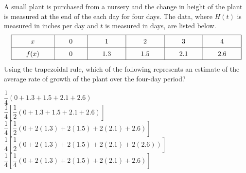 \begin{questions}
    \question A small plant is purchased from a nursery and the change in height of the plant is measured at the end of the each day for four days. The data, where $H(t)$ is measured in inches per day and $t$ is measured in days, are listed below. \begin{align*}
        \arraycolsep=22pt\def\arraystretch{1.5}
        \begin{array}{|c|c|c|c|c|c|c|}
            \hline
            x & 0 & 1 & 2 & 3 & 4 \\ \hline
            f(x) & 0 & 1.3 & 1.5 & 2.1 & 2.6 \\
            \hline
        \end{array}
    \end{align*}
    Using the trapezoidal rule, which of the following represents an estimate of the average rate of growth of the plant over the four-day period? \\

    \begin{oneparchoices}
        \choice $\dfrac{1}{4}(0 + 1.3 + 1.5 + 2.1 + 2.6)$ \\[11pt]
        \makebox[0.035\textwidth] \choice $\dfrac{1}{4}\left[\dfrac{1}{2}(0 + 1.3 + 1.5 + 2.1 + 2.6)\right]$ \\[11pt]
        \makebox[0.035\textwidth] \choice $\dfrac{1}{4}\left[\dfrac{1}{2}(0 + 2(1.3) + 2(1.5) + 2(2.1) + 2.6)\right]$ \\[11pt]
        \makebox[0.035\textwidth] \choice $\dfrac{1}{4}\left[\dfrac{1}{2}(0 + 2(1.3) + 2(1.5) + 2(2.1) + 2(2.6))\right]$ \\[11pt]
        \makebox[0.035\textwidth] \choice $\dfrac{1}{4}\left[\dfrac{1}{4}(0 + 2(1.3) + 2(1.5) + 2(2.1) + 2.6)\right]$
    \end{oneparchoices} \par \horizontalline
\end{questions}
